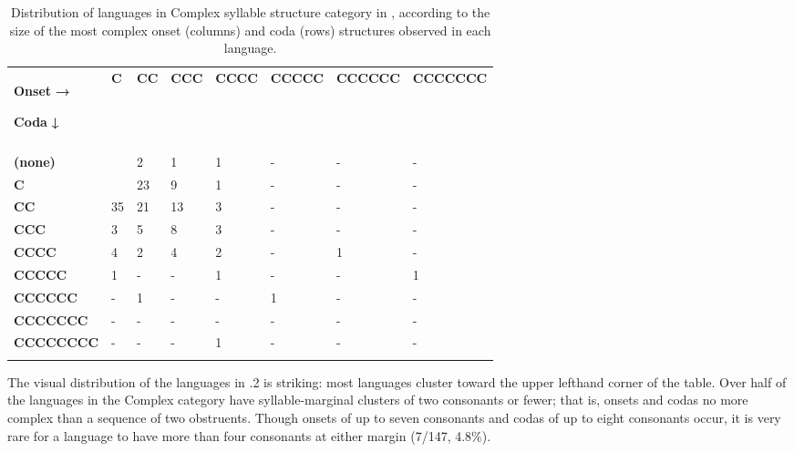 \begin{table}
\begin{tabularx}{\textwidth}{XXXXXXXX}
\lsptoprule
{ \textbf{Onset} \textbf{→}}

 \textbf{Coda} \textbf{↓} & \textbf{C} & \textbf{CC} & \textbf{CCC} & \textbf{CCCC} & \textbf{CCCCC} & \textbf{CCCCCC} & \textbf{CCCCCCC}\\
&  &  &  &  &  &  & \\
 \textbf{(none)} &  & 2 & 1 & 1 & {}- & {}- & {}-\\
\hhline{-~------}
 \textbf{C} &  & 23 & 9 & 1 & {}- & {}- & {}-\\
 \textbf{CC} & 35 & 21 & 13 & 3 & {}- & {}- & {}-\\
 \textbf{CCC} & 3 & 5 & 8 & 3 & {}- & {}- & {}-\\
 \textbf{CCCC} & 4 & 2 & 4 & 2 & {}- & 1 & {}-\\
 \textbf{CCCCC} & 1 & {}- & {}- & 1 & {}- & {}- & 1\\
 \textbf{CCCCCC} & {}- & 1 & {}- & {}- & 1 & {}- & {}-\\
 \textbf{CCCCCCC} & {}- & {}- & {}- & {}- & {}- & {}- & {}-\\
 \textbf{CCCCCCCC} & {}- & {}- & {}- & 1 & {}- & {}- & {}-\\
\lspbottomrule
\end{tabularx}
\caption{\label{tab:key:2.2.} Distribution of languages in Complex syllable structure category in \citet{Maddieson2013a}, according to the size of the most complex onset (columns) and coda (rows) structures observed in each language.}
\end{table}

  The visual distribution of the languages in .2 is striking: most languages cluster toward the upper lefthand corner of the table. Over half of the languages in the Complex category have syllable-marginal clusters of two consonants or fewer; that is, onsets and codas no more complex than a sequence of two obstruents. Though onsets of up to seven consonants and codas of up to eight consonants occur, it is very rare for a language to have more than four consonants at either margin (7/147, 4.8\%).


